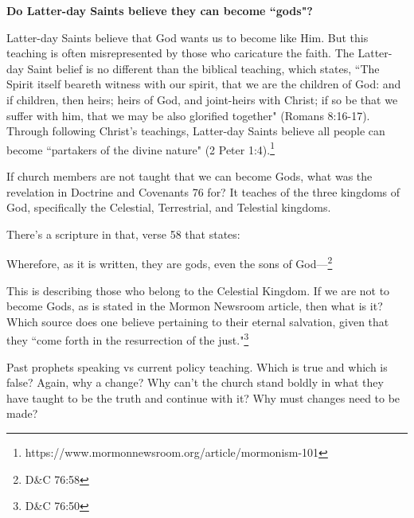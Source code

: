 \documentclass{article}
\begin{document}
\begin{displayquote}
\textbf{Do Latter-day Saints believe they can become ``gods"?}

Latter-day Saints believe that God wants us to become like Him. But this 
teaching is often misrepresented by those who caricature the faith. 
The Latter-day Saint belief is no different than the biblical teaching, 
which states, ``The Spirit itself beareth witness with our spirit, 
that we are the children of God: and if children, then heirs; heirs of God, 
and joint-heirs with Christ; if so be that we suffer with him, that we may be 
also glorified together" (Romans 8:16-17). Through following Christ's 
teachings, Latter-day Saints believe all people can become ``partakers of the 
divine nature"
(2 Peter 1:4).\footnote{https://www.mormonnewsroom.org/article/mormonism-101}
\end{displayquote}

If church members are not taught that we can become Gods, what was the 
revelation in Doctrine and Covenants 76 for? It teaches of the three kingdoms
of God, specifically the Celestial, Terrestrial, and Telestial kingdoms.

There's a scripture in that, verse 58 that states:

\begin{displayquote}
Wherefore, as it is written, they are gods, even the sons of 
God—\footnote{D\&C 76:58}
\end{displayquote}

This is describing those who belong to the Celestial Kingdom. If we are not to
become Gods, as is stated in the Mormon Newsroom article, then what is it? Which
source does one believe pertaining to their eternal salvation, given that they
``come forth in the resurrection of the just."\footnote{D\&C 76:50} 

Past prophets speaking vs current policy teaching. Which is true and which is
false? Again, why a change? Why can't the church stand boldly in what they have
taught to be the truth and continue with it? Why must changes need to be made?



\newpage

\printbibliography
\thispagestyle{empty}
\end{document}
